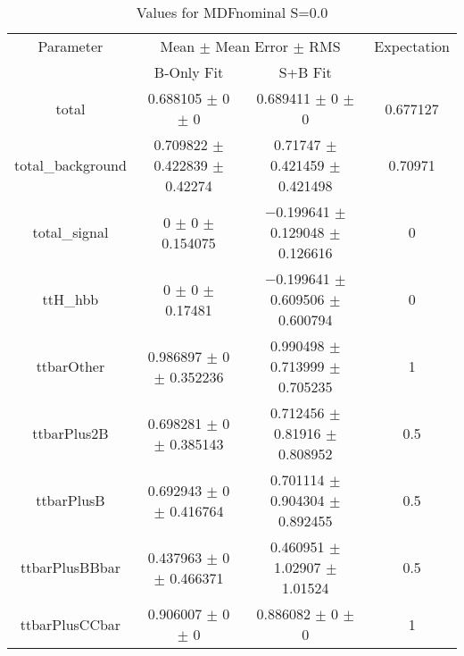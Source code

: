 \begin{table}
\centering
\caption{Values for MDFnominal S=0.0}
\begin{tabular}{cccc}
\toprule
Parameter & \multicolumn{2}{c}{Mean $\pm$ Mean Error $\pm$ RMS} & Expectation\\
 & B-Only Fit & S+B Fit & \\
\midrule
total & \num{0.688105} $\pm$ \num{0} $\pm$ \num{0} & \num{0.689411} $\pm$ \num{0} $\pm$ \num{0} & \num{0.677127}\\
total\_background & \num{0.709822} $\pm$ \num{0.422839} $\pm$ \num{0.42274} & \num{0.71747} $\pm$ \num{0.421459} $\pm$ \num{0.421498} & \num{0.70971}\\
total\_signal & \num{0} $\pm$ \num{0} $\pm$ \num{0.154075} & \num{-0.199641} $\pm$ \num{0.129048} $\pm$ \num{0.126616} & \num{0}\\
ttH\_hbb & \num{0} $\pm$ \num{0} $\pm$ \num{0.17481} & \num{-0.199641} $\pm$ \num{0.609506} $\pm$ \num{0.600794} & \num{0}\\
ttbarOther & \num{0.986897} $\pm$ \num{0} $\pm$ \num{0.352236} & \num{0.990498} $\pm$ \num{0.713999} $\pm$ \num{0.705235} & \num{1}\\
ttbarPlus2B & \num{0.698281} $\pm$ \num{0} $\pm$ \num{0.385143} & \num{0.712456} $\pm$ \num{0.81916} $\pm$ \num{0.808952} & \num{0.5}\\
ttbarPlusB & \num{0.692943} $\pm$ \num{0} $\pm$ \num{0.416764} & \num{0.701114} $\pm$ \num{0.904304} $\pm$ \num{0.892455} & \num{0.5}\\
ttbarPlusBBbar & \num{0.437963} $\pm$ \num{0} $\pm$ \num{0.466371} & \num{0.460951} $\pm$ \num{1.02907} $\pm$ \num{1.01524} & \num{0.5}\\
ttbarPlusCCbar & \num{0.906007} $\pm$ \num{0} $\pm$ \num{0} & \num{0.886082} $\pm$ \num{0} $\pm$ \num{0} & \num{1}\\
\bottomrule
\end{tabular}
\end{table}